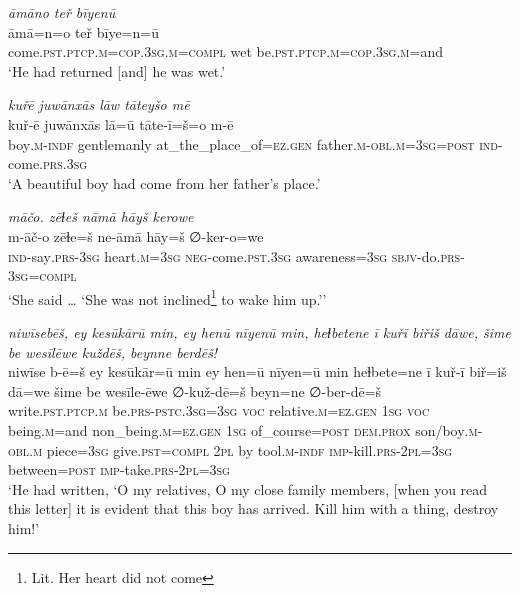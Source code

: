 \ea \label{KŠ.66}
\textit{āmāno teř bīyenū} \\ 
\gll āmā=n=o teř bīye=n=ū \\ 
 come\textsc{.pst}\textsc{.ptcp}\textsc{.m}\textsc{=cop}\textsc{.3sg}\textsc{.m}\textsc{=compl} wet be\textsc{.pst}\textsc{.ptcp}\textsc{.m}\textsc{=cop}\textsc{.3sg}\textsc{.m}=and \\ 
\glt `He had returned [and] he was wet.'
\z 
 
\ea \label{KŠ.68}
\textit{kuřē juwānxās lāw tāteyšo mē} \\ 
\gll kuř-ē juwānxās lā=ū tāte-ī=š=o m-ē \\ 
 boy\textsc{.m}\textsc{-indf} gentlemanly at\_the\_place\_of\textsc{\textsc{=ez.gen}} father\textsc{.m}\textsc{-obl}\textsc{.m}\textsc{=3sg}\textsc{=\textsc{post}} \textsc{ind-}come\textsc{.prs}\textsc{.3sg} \\ 
\glt `A beautiful boy had come from her father’s place.'
\z 
 
\ea \label{KŠ.69}
\textit{māčo. zēɫeš nāmā hāyš kerowe} \\ 
\gll m-āč-o zēɫe=š ne-āmā hāy=š ∅-ker-o=we \\ 
 \textsc{ind-}say\textsc{.prs}\textsc{-3sg} heart\textsc{.m}\textsc{=3sg} \textsc{neg-}come\textsc{.pst}\textsc{.3sg} awareness\textsc{=3sg} \textsc{sbjv-}do\textsc{.prs}\textsc{-3sg}\textsc{=compl} \\ 
\glt `She said … ‘She was not inclined\footnote{Lit. Her heart did not come} to wake him up.’'
\z 
 
\ea \label{KŠ.72}
\textit{niwīsebēš, ey kesūkārū min, ey henū nīyenū min, heɫbetene ī kuřī biřiš dāwe, šime be wesīlēwe kuždēš, beynne berdēš!} \\ 
\gll niwīse b-ē=š ey kesūkār=ū min ey hen=ū nīyen=ū min heɫbete=ne ī kuř-ī biř=iš dā=we šime be wesīle-ēwe ∅-kuž-dē=š beyn=ne ∅-ber-dē=š \\ 
 write\textsc{.pst}\textsc{.ptcp}\textsc{.m} be\textsc{.prs}\textsc{-pstc}\textsc{.3sg}\textsc{=3sg} \textsc{voc} relative\textsc{.m}\textsc{\textsc{=ez.gen}} \textsc{1sg} \textsc{voc} being\textsc{.m}=and non\_being\textsc{.m}\textsc{\textsc{=ez.gen}} \textsc{1sg} of\_course\textsc{=\textsc{post}} \textsc{dem.prox} son/boy\textsc{.m}\textsc{-obl}\textsc{.m} piece\textsc{=3sg} give\textsc{.pst}\textsc{=compl} \textsc{2pl} by tool\textsc{.m}\textsc{-indf} \textsc{imp-}kill\textsc{.prs}-\textsc{2pl}\textsc{=3sg} between\textsc{=\textsc{post}} \textsc{imp-}take\textsc{.prs}-\textsc{2pl}\textsc{=3sg} \\ 
\glt `He had written, ‘O my relatives, O my close family members, [when you read this letter] it is evident that this boy has arrived. Kill him with a thing, destroy him!'
\z 
 
